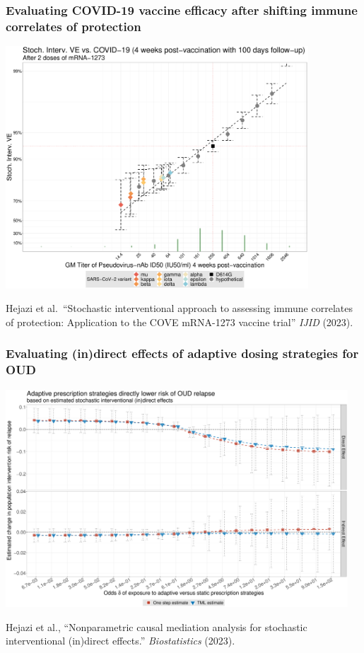 \documentclass[t]{beamer}
\begin{document}
\begin{frame}
  \frametitle{Evaluating COVID-19 vaccine efficacy after shifting immune
  correlates of protection}
  \vspace{-2em}
  \begin{center}
  \includegraphics[width=0.85\textwidth]
  {figures/sve_pseudoneutid50_immunobridging_2dose.pdf}\hspace*{4cm}
  \end{center}
  \scriptsize{
  Hejazi et al.~``Stochastic interventional approach to assessing immune
  correlates of protection: Application to the COVE mRNA-1273 vaccine trial''
  \textit{IJID} (2023).}
\end{frame}

\begin{frame}
  \frametitle{Evaluating (in)direct effects of adaptive dosing strategies for OUD}
  \vspace{-2em}
  \begin{center}
  \includegraphics[width=0.96\textwidth] {figures/hejazi_xbot.png}\hspace*{4cm}
  \end{center}
  \scriptsize{
  Hejazi et al., ``Nonparametric causal mediation analysis for stochastic
  interventional (in)direct effects.'' \textit{Biostatistics} (2023).}
\end{frame}
\end{document}
